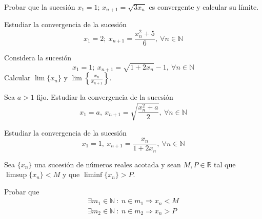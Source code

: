 \begin{ejercicio}\label{ej:6.5.8}
    Probar que la sucesión $x_1 = 1$; $x_{n+1}=\sqrt{3 x_n}$ es convergente y calcular su límite.
\end{ejercicio}

\begin{ejercicio}\label{ej:6.5.9}
    Estudiar la convergencia de la sucesión
    \begin{equation*}
        x_1 = 2; ~ x_{n+1}=\frac{x_n^2+5}{6}, ~ \forall n \in \mathbb{N}
    \end{equation*}
\end{ejercicio}

\begin{ejercicio}\label{ej:6.5.10}
    Considera la sucesión
    \begin{equation*}
        x_1=1; ~ x_{n+1}=\sqrt{1+2 x_n} - 1, ~ \forall n \in \mathbb{N}
    \end{equation*}
    Calcular $\lim \{x_n\}$ y $\lim \left\{\frac{x_n}{x_{n+1}}\right\}$.
\end{ejercicio}

\begin{ejercicio}\label{ej:6.5.11}
    Sea $a > 1$ fijo. Estudiar la convergencia de la sucesión
    \begin{equation*}
        x_1=a, ~ x_{n+1}=\sqrt{\frac{x_n^2+a}{2}}, ~ \forall n \in \mathbb{N}
    \end{equation*}
\end{ejercicio}

\begin{ejercicio}\label{ej:6.5.12}
    Estudiar la convergencia de la sucesión
    \begin{equation*}
        x_1 = 1, ~ x_{n+1} = \frac{x_n}{1+ 2 x_n}, ~ \forall n \in \mathbb{N}
    \end{equation*}
\end{ejercicio}

\begin{ejercicio}\label{ej:6.5.13}
    Sea $\{x_n\}$ una sucesión de números reales acotada y sean $M,P \in \mathbb{R}$ tal que $\limsup \{x_n\} < M$ y que $\liminf \{x_n\} > P$.

    Probar que
    \begin{gather*}
        \exists m_1 \in \mathbb{N} ~:~ n \in m_1 \Longrightarrow x_n < M\\
        \exists m_2 \in \mathbb{N} ~:~ n \in m_2 \Longrightarrow x_n > P
    \end{gather*}
\end{ejercicio}